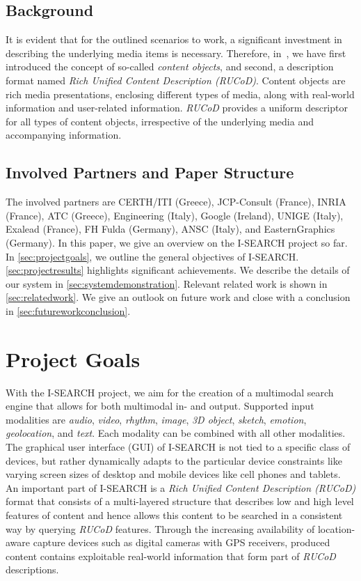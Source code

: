 \documentclass{acm_proc_article-sp}
\let\oldemph\emph
\renewcommand{\emph}[1]{\oldemph{\fontsize{9}{9}\selectfont #1}}
\begin{document}
\subsection{Background}
It is evident that for the outlined scenarios to work, a significant investment in describing the underlying media items is necessary.
Therefore, in~\cite{ijmis2010}, we have first introduced the concept of so-called \emph{content objects}, and second, a description format named \emph{Rich Unified Content Description (RUCoD)}.
Content objects are rich media presentations, enclosing different types of media, along with real-world information and user-related information.
\emph{RUCoD} provides a uniform descriptor for all types of content objects, irrespective of the underlying media and accompanying information.

\subsection{Involved Partners and Paper Structure}
The involved partners are CERTH/ITI (Greece), JCP-Consult (France), INRIA (France), ATC (Greece), Engineering (Italy), Google (Ireland), UNIGE (Italy), Exalead (France), FH Fulda (Germany), ANSC (Italy), and EasternGraphics (Germany).
In this paper, we give an overview on the \mbox{I-SEARCH} project so far.
In \autoref{sec:projectgoals}, we outline the general objectives of  \mbox{I-SEARCH}.
\autoref{sec:projectresults} highlights significant achievements.
We describe the details of our system in \autoref{sec:systemdemonstration}.
Relevant related work is shown in \autoref{sec:relatedwork}.
We give an outlook on future work and close with a conclusion in \autoref{sec:futureworkconclusion}.

\section{Project Goals} \label{sec:projectgoals}
With the \mbox{I-SEARCH} project, we aim for the creation of a multimodal search engine that allows for both multimodal in- and output.
Supported input modalities are \emph{audio}, \emph{video}, \emph{rhythm}, \emph{image}, \emph{3D object}, \emph{sketch}, \emph{emotion}, \emph{geolocation}, and \emph{text}.
Each modality can be combined with all other modalities.
The graphical user interface (GUI) of \mbox{I-SEARCH} is not tied to a specific class of devices, but rather dynamically adapts to the particular device constraints like varying screen sizes of desktop and mobile devices like cell phones and tablets.
An important part of \mbox{I-SEARCH} is a \emph{Rich Unified Content Description (RUCoD)} format that consists of a multi-layered structure that describes low and high level features of content and hence allows this content to be searched in a consistent way by querying \emph{RUCoD} features.
Through the increasing availability of location-aware capture devices such as digital cameras with GPS receivers, produced content contains exploitable real-world information that form part of \emph{RUCoD} descriptions.
\end{document}
